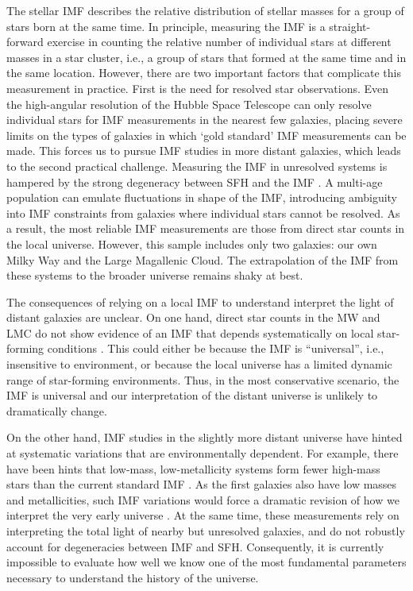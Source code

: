 \documentclass[11pt,preprint]{aastex}
\begin{document}
The stellar IMF describes the relative distribution of stellar masses for a group of stars born at the same time.  In principle, measuring the IMF is a straight-forward exercise in counting the relative number of individual stars at different masses in a star cluster, i.e., a group of stars that formed at the same time and in the same location.  However, there are two important factors that complicate this measurement in practice.  First is the need for resolved star observations. Even the high-angular resolution of the Hubble Space Telescope can only resolve individual stars for IMF measurements in the nearest few galaxies, placing severe limits on the types of galaxies in which `gold standard' IMF measurements can be made.  This forces us to pursue IMF studies in more distant galaxies, which leads to the second practical challenge.  Measuring the IMF in unresolved systems is hampered by the strong degeneracy between SFH and the IMF \citep{miller1979, elmegreen2006}.  A multi-age population can emulate fluctuations in shape of the IMF, introducing ambiguity into IMF constraints from galaxies where individual stars cannot be resolved.   As a result, the most reliable IMF measurements are those from direct star counts in the local universe.  However, this sample includes only two galaxies: our own Milky Way and the Large Magallenic Cloud.  The extrapolation of the IMF from these systems to the broader universe remains shaky at best.

The consequences of relying on a local IMF to understand interpret the light of distant galaxies are unclear.  On one hand, direct star counts in the MW and LMC do not show evidence of an IMF that depends systematically on local star-forming conditions \citep[e.g., gas density, metallicity, star formation intensity]{bastian2010}. This could either be because the IMF is ``universal'', i.e., insensitive to environment, or because the local universe has a limited dynamic range of star-forming environments.  Thus, in the most conservative scenario, the IMF is universal and our interpretation of the distant universe is unlikely to dramatically change.  

On the other hand, IMF studies in the slightly more distant universe have hinted at systematic variations that are environmentally dependent.  For example, there have been hints that low-mass, low-metallicity systems form fewer high-mass stars than the current standard IMF \citep[e.g.,][]{lee2009, meurer2009}.  As the first galaxies also have low masses and metallicities, such IMF variations would force a dramatic revision of how we interpret the very early universe \citep[e.g.,][]{pflammAltenburg2009}.  At the same time, these measurements rely on interpreting the total light of nearby but unresolved galaxies, and do not robustly account for degeneracies between IMF and SFH.  Consequently, it is currently impossible to evaluate how well we know one of the most fundamental parameters necessary to understand the history of the universe. 
\end{document}
